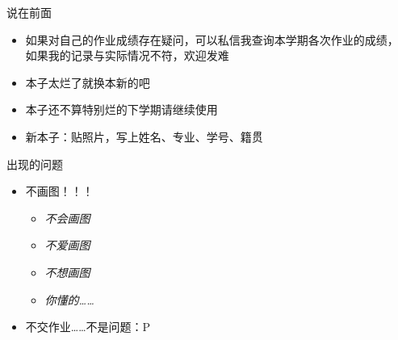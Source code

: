 
\titlepage

\begin{frame}{说在前面}
	\linespread{1.5}
	  \begin{itemize}[<+-|alert@+>]
	    \item 如果对自己的作业成绩存在疑问，可以私信我查询本学期各次作业的成绩，
	    如果我的记录与实际情况不符，欢迎发难
	    \item 本子太烂了就换本新的吧
	    \item 本子还不算特别烂的下学期请继续使用
	    \item 新本子：贴照片，写上姓名、专业、学号、籍贯
	  \end{itemize}
\end{frame}


\begin{frame}{出现的问题}
	\linespread{1.5}
	  \begin{itemize}%
	    \item 不画图！！！
	    \begin{itemize}
	      \item \b\it 不会画图
	      \item \b\it 不爱画图
	      \item \b\it 不想画图
	      \item \b\it 你懂的\ldots\ldots
	    \end{itemize}
	    \item 不交作业\ldots\ldots 不是问题：P
	  \end{itemize}
\end{frame}

